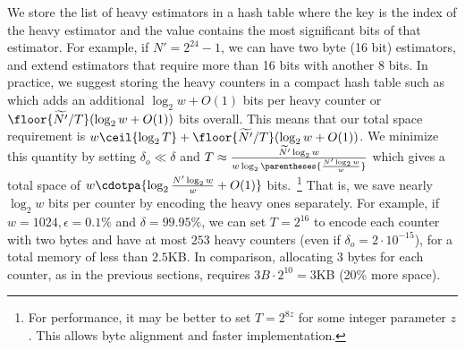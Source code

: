 We store the list of heavy estimators in a hash table where the key is the index of the heavy estimator and the value contains the most significant bits of that estimator. For example, if $N' = 2^{24}-1$, we can have two byte (16 bit) estimators, and extend estimators that require more than 16 bits with another 8 bits. %
In practice, we suggest storing the heavy counters in  a compact hash table such as~\cite{TinyTable,TinyTable2} which adds an additional $\log_2 w + O(1)$ bits per heavy counter or $\floor{\widetilde{N'}/T}(\log_2 w + O(1))$ bits overall.
This means that our total space requirement is $w\ceil{\log_2 T}+\floor{\widetilde{N'}/T}(\log_2 w + O(1))$. 
We minimize this quantity by setting $\delta_o \ll \delta$ and $T\approx \frac{\widetilde{N'}\log_2 w}{w\log_2\parentheses{ \frac{N'\log_2 w}{w}}}$ which gives a total space of $w\cdotpa {\log_2{\frac{N'\log_2 w}{w}}+O(1)}$ bits.~\footnote{For performance, it may be better to set $T=2^{8z}$ for some integer parameter $z$. This allows byte alignment and faster implementation.} That is, we save nearly $\log_2 w$ bits per counter by encoding the heavy ones separately. 
For example, if $w=1024, \epsilon=0.1\%$ and $\delta=99.95\%$, we can set $T=2^{16}$ to encode each counter with two bytes and have at most $253$ heavy counters (even if $\delta_o=2\cdot10^{-15}$), for a total memory of less than $2.5$KB. 
In comparison, allocating 3 bytes for each counter, as in the previous sections, requires $3B\cdot2^{10}=3$KB  (20\% more space).  %





